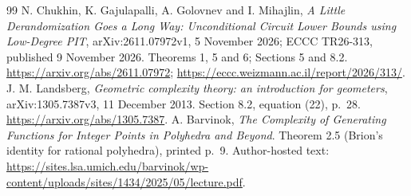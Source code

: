 \documentclass[11pt,a4paper]{article}
\begin{document}
\begin{thebibliography}{99}
 N. Chukhin, K. Gajulapalli, A. Golovnev and I. Mihajlin, \emph{A Little Derandomization Goes a Long Way: Unconditional Circuit Lower Bounds using Low-Degree PIT}, arXiv:2611.07972v1, 5 November 2026; ECCC TR26-313, published 9 November 2026. Theorems 1, 5 and 6; Sections 5 and 8.2. \url{https://arxiv.org/abs/2611.07972}; \url{https://eccc.weizmann.ac.il/report/2026/313/}.
 J. M. Landsberg, \emph{Geometric complexity theory: an introduction for geometers}, arXiv:1305.7387v3, 11 December 2013. Section 8.2, equation (22), p.~28. \url{https://arxiv.org/abs/1305.7387}.
 A. Barvinok, \emph{The Complexity of Generating Functions for Integer Points in Polyhedra and Beyond}. Theorem 2.5 (Brion's identity for rational polyhedra), printed p.~9. Author-hosted text: \url{https://sites.lsa.umich.edu/barvinok/wp-content/uploads/sites/1434/2025/05/lecture.pdf}.


\end{thebibliography}
\end{document}

